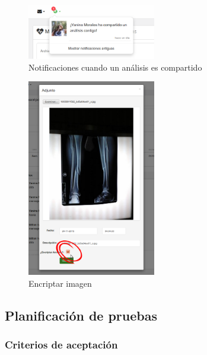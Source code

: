         \begin{figure}[h]
        	\centering
        	\includegraphics[width=0.5\textwidth]{img/notificacion_comparticion}
        	\caption{Notificaciones cuando un análisis es compartido}
        	\label{notificacion_comparticion}
        \end{figure}
        
                \begin{figure}[h]
                	\centering
                	\includegraphics[width=0.5\textwidth]{img/encriptar_imagen}
                	\caption{Encriptar imagen}
                	\label{encriptar_imagen}
                \end{figure}
 
\subsection{Planificación de pruebas}                
\subsubsection{Criterios de aceptación}


